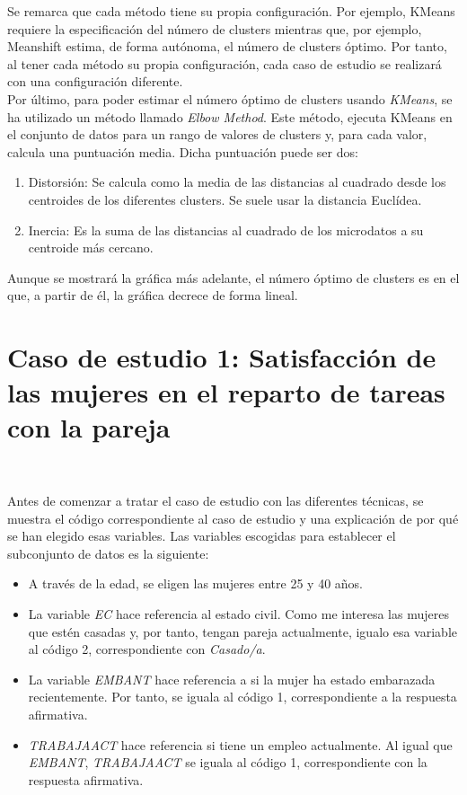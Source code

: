 \documentclass[paper=a4, fontsize=12pt]{article} %
\numberwithin{equation}{section} %
\numberwithin{figure}{section} %
\numberwithin{table}{section} %
\begin{document}
Se remarca que cada método tiene su propia configuración. Por ejemplo, KMeans requiere la especificación del número de clusters mientras que, por ejemplo, Meanshift estima, de forma autónoma, el número de clusters óptimo. Por tanto, al tener cada método su propia configuración, cada caso de estudio se realizará con una configuración diferente.\\

Por último, para poder estimar el número óptimo de clusters usando \textit{KMeans}, se ha utilizado un método llamado \textit{Elbow Method}. Este método, ejecuta KMeans en el conjunto de datos para un rango de valores de clusters y, para cada valor, calcula una puntuación media. Dicha puntuación puede ser dos:

\begin{enumerate}
\item Distorsión: Se calcula como la media de las distancias al cuadrado desde los centroides de los diferentes clusters. Se suele usar la distancia Euclídea.
\item Inercia: Es la suma de las distancias al cuadrado de los microdatos a su centroide más cercano.
\end{enumerate}

Aunque se mostrará la gráfica más adelante, el número óptimo de clusters es en el que, a partir de él, la gráfica decrece de forma lineal.
\newpage
\section{Caso de estudio 1: Satisfacción de las mujeres en el reparto de tareas con la pareja}

\begin{figure}[H]
    \centering
    \mbox {
    }
\end{figure}

Antes de comenzar a tratar el caso de estudio con las diferentes técnicas, se muestra el código correspondiente al caso de estudio y una explicación de por qué se han elegido esas variables. Las variables escogidas para establecer el subconjunto de datos es la siguiente:
\begin{itemize}
\item A través de la edad, se eligen las mujeres entre 25 y 40 años.
\item La variable \textit{EC} hace referencia al estado civil. Como me interesa las mujeres que estén casadas y, por tanto, tengan pareja actualmente, igualo esa variable al código 2, correspondiente con \textit{Casado/a}.
\item La variable \textit{EMBANT} hace referencia a si la mujer ha estado embarazada recientemente. Por tanto, se iguala al código 1, correspondiente a la respuesta afirmativa.
\item \textit{TRABAJAACT} hace referencia si tiene un empleo actualmente. Al igual que \textit{EMBANT}, \textit{TRABAJAACT} se iguala al código 1, correspondiente con la respuesta afirmativa.
\end{itemize}
\end{document}

